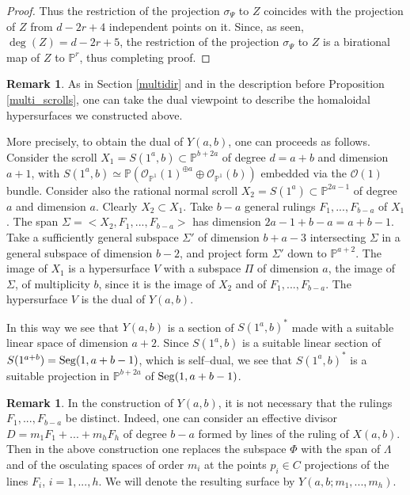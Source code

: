 \documentclass[11pt]{article}   %
\theoremstyle{definition}
\newtheorem{Remark}[Theorem]{Remark}
\numberwithin{Theorem}{section} \numberwithin{equation}{section}
\renewcommand{\O}{{\mathcal O}}
\newcommand{\Proj}{{\mathbb P}}
\newcommand{\p}{{\mathbb P}}
\begin{document}
{\begin{proof}
Thus the restriction of the projection $\sigma_\Psi$ to $Z$
coincides with the projection of $Z$ from $d-2r+4$ independent
points on it. Since, as seen, $\deg(Z)=d-2r+5$, the restriction of
the projection $\sigma_\Psi$ to   $Z$ is a birational map of $Z$ to
$\p^ r$, thus completing proof.
\end{proof}


\begin{Remark}\label{duale}\rm As in
{ Section} \ref{multidir} and in the description
before Proposition \ref{multi_scrolls}, one can take the dual
viewpoint to describe the homaloidal hypersurfaces we constructed
above.

More precisely, to obtain the dual of $Y(a,b)$, one can proceeds as
follows. Consider the scroll $X_1=S(1^ a,b)\subset\p^{b+2a}$ of
degree $d=a+b$ and dimension $a+1$, with $S(1^ a,b)\simeq
\Proj(\O_{\Proj^ 1}(1)^ {\oplus a}\oplus  \O_{\Proj^ 1}(b))$
embedded via the $\O(1)$ bundle. Consider also the rational normal
scroll $X_2=S(1^ a)\subset\p^{2a-1}$ of degree $a$ and dimension
$a$. Clearly $X_2\subset X_1$. Take $b-a$ general rulings
$F_1,...,F_{b-a}$ of $X_1$. The span $\Sigma=<X_2,F_1,...,F_{b-a}>$
has dimension $2a-1+b-a=a+b-1$. Take a sufficiently general subspace
$\Sigma'$ of dimension $b+a-3$ intersecting $\Sigma$ in a general
subspace of dimension $b-2$, and project form $\Sigma'$ down to $\p^
{a+2}$. The image of $X_1$ is a hypersurface $V$ with a subspace
$\Pi$ of dimension $a$, the image of $\Sigma$, of multiplicity $b$,
since it is the image of $X_2$ and of $F_1,...,F_{b-a}$. The
hypersurface $V$ is the dual of $Y(a,b)$.

In this way we see that $Y(a,b)$ is a section
of $S(1^ a,b)^ *$ made with a suitable linear space of dimension $a+2$.
Since $S(1^ a,b)$ is a suitable linear section of  $S(1^ {a+b})={\rm
Seg}(1,a+b-1)$, which is self--dual, we see that $S(1^ a,b)^ *$ is a
suitable projection in $\p^{b+2a}$ of ${\rm Seg}(1,a+b-1)$.
\end{Remark}

\begin{Remark}\label{general} \rm In the construction of
$Y(a,b)$, it is not necessary that the rulings $F_1,...,F_{b-a}$ be
distinct. Indeed, one can consider an effective divisor
$D=m_1F_1+...+m_hF_h$ of degree $b-a$ formed by lines of the ruling
of $X(a,b)$. Then in the above construction one replaces the
subspace $\Phi$ with the span of $\Lambda$ and of the osculating
spaces of order $m_i$ at the points $p_i\in C$ projections of the lines
$F_i$, $i=1,...,h$. We will denote the resulting surface by
$Y(a,b;m_1,...,m_h)$.



\end{Remark}}
\end{document}
